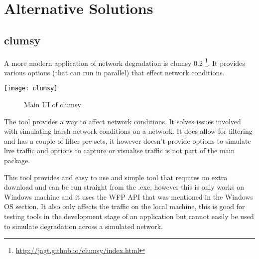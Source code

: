 \section{Alternative Solutions}


\subsection{clumsy}
A more modern application of network degradation is clumsy 0.2 \footnote{\url{http://jagt.github.io/clumsy/index.html}}. It provides various options (that can run in parallel) that effect network conditions. 

\begin{center}
	\texttt{[image: clumsy]}
	\begin{figure}[h]
		\caption{Main UI of clumsy}
	\end{figure}
\end{center}

The tool provides a way to affect network conditions. It solves issues involved with simulating harsh network conditions on a network. It does allow for filtering and has a couple of filter pre-sets, it however doesn't provide options to simulate live traffic and options to capture or visualise traffic is not part of the main package.

This tool provides and easy to use and simple tool that requires no extra download and can be run straight from the .exe, however this is only works on Windows machine and it uses the WFP API that was mentioned in the Windows OS section. It also only affects the traffic on the local machine, this is good for testing tools in the development stage of an application but cannot easily be used to simulate degradation across a simulated network.

